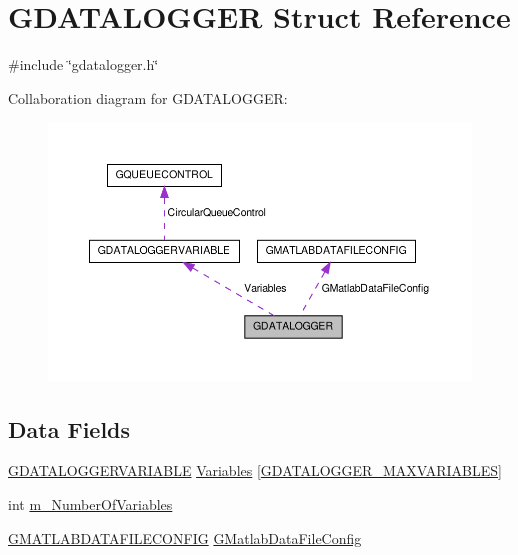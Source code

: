 \hypertarget{structGDATALOGGER}{\section{G\-D\-A\-T\-A\-L\-O\-G\-G\-E\-R Struct Reference}
\label{structGDATALOGGER}
}


{\ttfamily \#include \char`\"{}gdatalogger.\-h\char`\"{}}



Collaboration diagram for G\-D\-A\-T\-A\-L\-O\-G\-G\-E\-R\-:
\nopagebreak
\begin{figure}[H]
\begin{center}
\leavevmode
\includegraphics[width=350pt]{structGDATALOGGER__coll__graph}
\end{center}
\end{figure}
\subsection*{Data Fields}
\begin{DoxyCompactItemize}
\item 
\hyperlink{structGDATALOGGERVARIABLE}{G\-D\-A\-T\-A\-L\-O\-G\-G\-E\-R\-V\-A\-R\-I\-A\-B\-L\-E} \hyperlink{structGDATALOGGER_a6af9584d8665205b950cb2dcc5f90a94}{Variables} \mbox{[}\hyperlink{gdatalogger_8h_a2ddc529b6734b7a9222a5fbd1305581e}{G\-D\-A\-T\-A\-L\-O\-G\-G\-E\-R\-\_\-\-M\-A\-X\-V\-A\-R\-I\-A\-B\-L\-E\-S}\mbox{]}
\item 
int \hyperlink{structGDATALOGGER_a2ac727ee6c50f7e04030cbe531158f08}{m\-\_\-\-Number\-Of\-Variables}
\item 
\hyperlink{structGMATLABDATAFILECONFIG}{G\-M\-A\-T\-L\-A\-B\-D\-A\-T\-A\-F\-I\-L\-E\-C\-O\-N\-F\-I\-G} \hyperlink{structGDATALOGGER_a062fd3836dbd0b1bec129ab372bff04a}{G\-Matlab\-Data\-File\-Config}
\end{DoxyCompactItemize}


